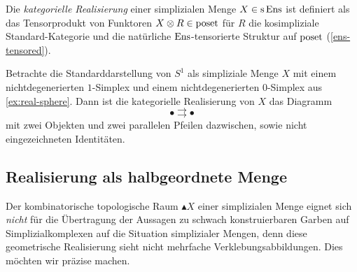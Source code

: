 \begin{defn}
  Die \emph{kategorielle Realisierung} einer simplizialen Menge $X \in
  \operatorname{s}\operatorname{Ens}$ ist definiert als das Tensorprodukt von Funktoren $X \otimes
  R \in \operatorname{poset}$ für $R$ die kosimpliziale Standard-Kategorie und die
  natürliche $\operatorname{Ens}$-tensorierte Struktur auf $\operatorname{poset}$
  (\ref{ens-tensored}).
\end{defn}
\begin{bsp}
  Betrachte die Standarddarstellung von $S^1$ als simpliziale Menge
  $X$ mit einem nichtdegenerierten $1$-Simplex und einem
  nichtdegenerierten $0$-Simplex aus \ref{ex:real-sphere}. Dann ist
  die kategorielle Realisierung von $X$ das Diagramm
  \[ \bullet \rightrightarrows \bullet \]
  mit zwei Objekten und zwei parallelen Pfeilen dazwischen, sowie
  nicht eingezeichneten Identitäten.
\end{bsp}

\subsection{Realisierung als halbgeordnete Menge}

Der kombinatorische topologische Raum $\blacktriangle X$ einer
simplizialen Menge eignet sich \emph{nicht} für die Übertragung der
Aussagen zu schwach konstruierbaren Garben auf Simplizialkomplexen auf
die Situation simplizialer Mengen, denn diese geometrische
Realisierung sieht nicht mehrfache Verklebungsabbildungen. Dies
möchten wir präzise machen.

